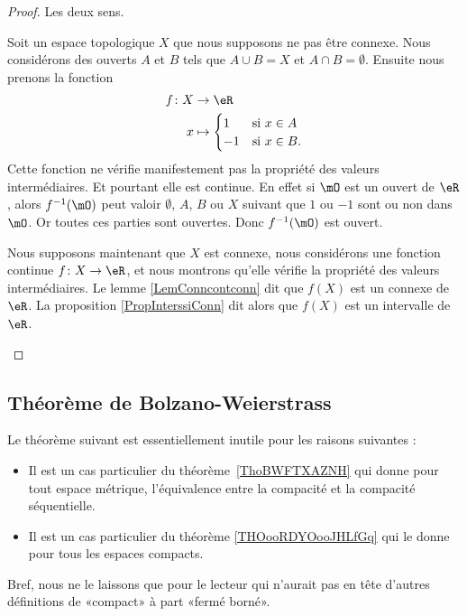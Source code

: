 \begin{proof}
	Les deux sens.
	\begin{subproof}
		\spitem[\( \Rightarrow\)]
		Soit un espace topologique \( X\) que nous supposons ne pas être connexe. Nous considérons des ouverts \( A\) et \( B\) tels que \( A\cup B=X\) et \( A\cap B=\emptyset\). Ensuite nous prenons la fonction
		\begin{equation}
			\begin{aligned}
				f\colon X & \to \eR                        \\
				x         & \mapsto \begin{cases}
					                    1  & \text{si } x\in A \\
					                    -1 & \text{si }x\in B.
				                    \end{cases}
			\end{aligned}
		\end{equation}
		Cette fonction ne vérifie manifestement pas la propriété des valeurs intermédiaires. Et pourtant elle est continue. En effet si \( \mO\) est un ouvert de \( \eR\), alors \( f^{-1}(\mO)\) peut valoir \( \emptyset\), \( A\), \( B\) ou \( X\) suivant que \( 1\) ou \( -1\) sont ou non dans \( \mO\). Or toutes ces parties sont ouvertes. Donc \( f^{-1}(\mO)\) est ouvert.

		\spitem[\( \Leftarrow\)]
		Nous supposons maintenant que \( X\) est connexe, nous considérons une fonction continue \(f \colon X\to \eR  \), et nous montrons qu'elle vérifie la propriété des valeurs intermédiaires. Le lemme \ref{LemConncontconn} dit que \( f(X)\) est un connexe de \( \eR\). La proposition \ref{PropInterssiConn} dit alors que \( f(X)\) est un intervalle de \( \eR\).
	\end{subproof}
\end{proof}


\subsection{Théorème de Bolzano-Weierstrass}


Le théorème suivant est essentiellement inutile pour les raisons suivantes :
\begin{itemize}
	\item
	      Il est un cas particulier du théorème~\ref{ThoBWFTXAZNH} qui donne pour tout espace métrique, l'équivalence entre la compacité et la compacité séquentielle.
	\item
	      Il est un cas particulier du théorème \ref{THOooRDYOooJHLfGq} qui le donne pour tous les espaces compacts.
\end{itemize}
Bref, nous ne le laissons que pour le lecteur qui n'aurait pas en tête d'autres définitions de «compact» à part «fermé borné».

